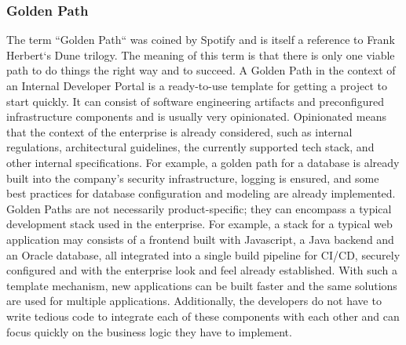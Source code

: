 \documentclass[a4paper,12pt]{article}
\begin{document}
    \subsubsection{Golden Path}
    \label{sssec:goldenpath}
    The term ``Golden Path`` was coined by Spotify\parencite{spotifygoldenpath} and is itself a reference to Frank
    Herbert`s Dune trilogy.
    The meaning of this term is that there is only one viable path to do things the right way and to succeed.
    A Golden Path in the context of an Internal Developer Portal is a ready-to-use template for getting a project
    to start quickly.
    It can consist of software engineering artifacts and preconfigured infrastructure components and is usually very
    opinionated.
    Opinionated means that the context of the enterprise is already considered, such as internal regulations,
    architectural guidelines, the currently supported tech stack, and other internal specifications.
    For example, a golden path for a database is already built into the company's security infrastructure,
    logging is ensured, and some best practices for database configuration and modeling are already implemented.\\
    Golden Paths are not necessarily product-specific;
    they can encompass a typical development stack used in the enterprise.
    For example, a stack for a typical web application may consists of a frontend built with Javascript, a Java backend
    and an Oracle database, all integrated into a single build pipeline for CI/CD,    securely configured and with
    the enterprise look and feel already established.
    With such a template mechanism, new applications can be built faster and the same solutions are used for multiple
    applications.
    Additionally, the developers do not have to write tedious code to integrate each of these components with each other
    and can focus quickly on the business logic they have to implement.
\end{document}
